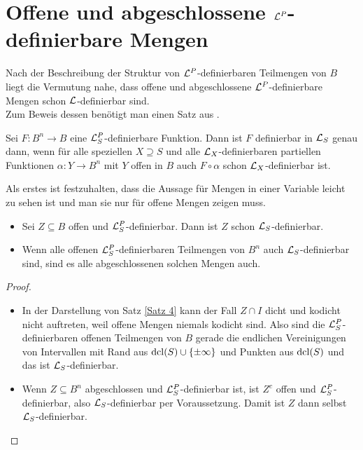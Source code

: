 \section{Offene und abgeschlossene $\mathcal{L}^P$-definierbare Mengen}
Nach der Beschreibung der Struktur von $\mathcal{L}^P$-definierbaren Teilmengen von $B$ liegt die Vermutung nahe, dass offene und abgeschlossene $\mathcal{L}^P$-definierbare Mengen schon $\mathcal{L}$-definierbar sind.\\
Zum Beweis dessen benötigt man einen Satz aus \cite{Piz}.
\begin{theorem}\label{Kurven}
	Sei $F:B^n\rightarrow B$ eine $\mathcal{L}^P_S$-definierbare Funktion. Dann ist $F$ definierbar in $\mathcal{L}_S$ genau dann, wenn für alle speziellen $X\supseteq S$ und alle $\mathcal{L}_X$-definierbaren partiellen Funktionen $\alpha: Y\rightarrow B^n$ mit $Y$ offen in $B$ auch $F\circ\alpha$ schon $\mathcal{L}_X$-definierbar ist.
\end{theorem}

Als erstes ist festzuhalten, dass die Aussage für Mengen in einer Variable leicht zu sehen ist und man sie nur für offene Mengen zeigen muss.
\begin{lemma}
	\begin{itemize}
		\item Sei $Z\subseteq B$ offen und $\mathcal{L}^P_S$-definierbar. Dann ist $Z$ schon $\mathcal{L}_S$-definierbar.
		\item Wenn alle offenen $\mathcal{L}^P_S$-definierbaren Teilmengen von $B^n$ auch $\mathcal{L}_S$-definierbar sind, sind es alle abgeschlossenen solchen Mengen auch.
	\end{itemize}
\end{lemma}
\begin{proof}
	\begin{itemize}
		\item In der Darstellung von Satz \ref{Satz 4} kann der Fall $Z\cap I$ dicht und kodicht nicht auftreten, weil offene Mengen niemals kodicht sind. Also sind die $\mathcal{L}^P_S$-definierbaren offenen Teilmengen von $B$ gerade die endlichen Vereinigungen von Intervallen mit Rand aus $\operatorname{dcl}(S)\cup\{\pm\infty\}$ und Punkten aus $\operatorname{dcl}(S)$ und das ist $\mathcal{L}_S$-definierbar.
		\item Wenn $Z\subseteq B^n$ abgeschlossen und $\mathcal{L}^P_S$-definierbar ist, ist $Z^c$ offen und $\mathcal{L}^P_S$-definierbar, also $\mathcal{L}_S$-definierbar per Voraussetzung. Damit ist $Z$ dann selbst $\mathcal{L}_S$-definierbar.
	\end{itemize}
\end{proof}

